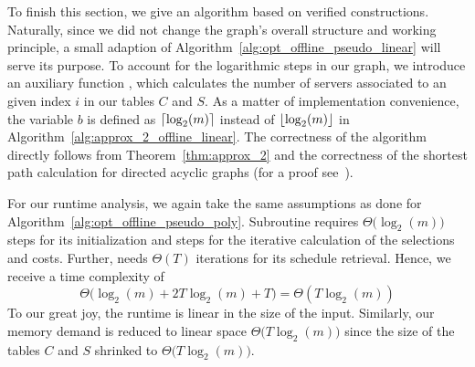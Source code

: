 To finish this section, we give an algorithm based on verified constructions. Naturally, since we did not change the graph's overall structure and working principle, a small adaption of Algorithm~\ref{alg:opt_offline_pseudo_linear} will serve its purpose. To account for the logarithmic steps in our graph, we introduce an auxiliary function , which calculates the number of servers associated to an given index $i$ in our tables $C$ and $S$. As a matter of implementation convenience, the variable $b$ is defined as $\lceil\log_2(m)\rceil$ instead of $\lfloor\log_2(m)\rfloor$ in Algorithm~\ref{alg:approx_2_offline_linear}.
The correctness of the algorithm directly follows from Theorem~\ref{thm:approx_2} and the correctness of the shortest path calculation for directed acyclic graphs (for a proof see~\parencite[Section~24.2]{intro-algo}).

For our runtime analysis, we again take the same assumptions as done for Algorithm~\ref{alg:opt_offline_pseudo_poly}. Subroutine  requires $\Theta\bigl(\log_2(m)\bigr)$ steps for its initialization and  steps for the iterative calculation of the selections and costs. Further,  needs $\Theta(T)$ iterations for its schedule retrieval. Hence, we receive a time complexity of
\begin{equation*}
	\Theta\bigl(\log_2(m)+2T\log_2(m)+T\bigr)=\Theta(T\log_2(m))
\end{equation*}
To our great joy, the runtime is linear in the size of the input. Similarly, our memory demand is reduced to linear space $\Theta\bigl(T\log_2(m)\bigr)$ since the size of the tables $C$ and $S$ shrinked to $\Theta\bigl(T\log_2(m)\bigr)$.

